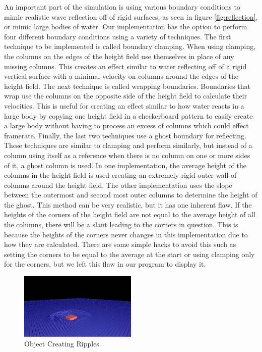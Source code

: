 \documentclass[12pt,notitlepage]{article}
\begin{document}
An important part of the simulation is using various boundary conditions to 
mimic realistic wave reflection off of rigid surfaces, as seen in figure 
\ref{fig:reflection}, or mimic large bodies of 
water. Our implementation has the option to perform four different boundary 
conditions using a variety of techniques. The first technique to be implemented 
is called boundary clamping. When using clamping, the columns on the edges of 
the height field use themselves in place of any missing columns. This creates 
an effect similar to water reflecting off of a rigid vertical surface with a 
minimal velocity on columns around the edges of the height field. The next 
technique is called wrapping boundaries. Boundaries that wrap use the columns 
on the opposite side of the height field to calculate their velocities. This is 
useful for creating an effect similar to how water reacts in a large body by 
copying one height field in a checkerboard pattern to easily create a large 
body without having to process an excess of columns which could effect 
framerate. Finally, the last two techniques use a ghost boundary for 
reflecting. These techniques are similar to clamping and perform similarly, but 
instead of a column using itself as a reference when there is no column on one 
or more sides of it, a ghost column is used. In one implementation, the average 
height of the columns in the height field is used creating an extremely rigid 
outer wall of columns around the height field. The other implementation uses 
the slope between the outermost and second most outer columns to determine the 
height of the ghost. This method can be very realistic, but it has one inherent 
flaw. If the heights of the corners of the height field are not equal to the 
average height of all the columns, there will be a slant leading to the corners 
in question. This is because the heights of the corners never changes in this 
implementation due to how they are calculated. There are some simple hacks to 
avoid this such as setting the corners to be equal to the average at the start 
or using clamping only for the corners, but we left this flaw in our program to 
display it.

\begin{figure}[H]
    \caption{Object Creating Ripples}
    \label{fig:ripples}
    \centering
    \includegraphics[width=0.5\textwidth]{../www/images/objectRipples}
\end{figure}
\end{document}
